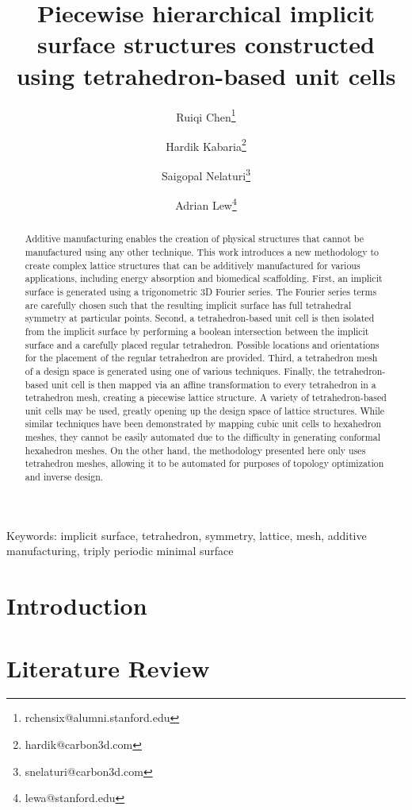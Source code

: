 \documentclass{article}
\title{Piecewise hierarchical implicit surface structures constructed using tetrahedron-based unit cells}
\author[1]{Ruiqi Chen\thanks{rchensix@alumni.stanford.edu}}
\author[1]{Hardik Kabaria\thanks{hardik@carbon3d.com}}
\author[1]{Saigopal Nelaturi\thanks{snelaturi@carbon3d.com}}
\author[2]{Adrian Lew\thanks{lewa@stanford.edu}}
\affil[1]{Carbon Inc., 1089 Mills Way, Redwood City CA 94063}
\affil[2]{Department of Mechanical Engineering, Stanford University, 440 Escondido Mall, Stanford CA 94305}
\date{}
\begin{document}
\maketitle

\begin{abstract}
   Additive manufacturing enables the creation of physical structures that cannot be manufactured using any other technique. This work introduces a new methodology to create complex lattice structures that can be additively manufactured for various applications, including energy absorption and biomedical scaffolding. First, an implicit surface is generated using a trigonometric 3D Fourier series. The Fourier series terms are carefully chosen such that the resulting implicit surface has full tetrahedral symmetry at particular points. Second, a tetrahedron-based unit cell is then isolated from the implicit surface by performing a boolean intersection between the implicit surface and a carefully placed regular tetrahedron. Possible locations and orientations for the placement of the regular tetrahedron are provided. Third, a tetrahedron mesh of a design space is generated using one of various techniques. Finally, the tetrahedron-based unit cell is then mapped via an affine transformation to every tetrahedron in a tetrahedron mesh, creating a piecewise lattice structure. A variety of tetrahedron-based unit cells may be used, greatly opening up the design space of lattice structures. While similar techniques have been demonstrated by mapping cubic unit cells to hexahedron meshes, they cannot be easily automated due to the difficulty in generating conformal hexahedron meshes. On the other hand, the methodology presented here only uses tetrahedron meshes, allowing it to be automated for purposes of topology optimization and inverse design.
\end{abstract}

Keywords: implicit surface, tetrahedron, symmetry, lattice, mesh, additive manufacturing, triply periodic minimal surface

\section{Introduction}

\section{Literature Review}
\end{document}
